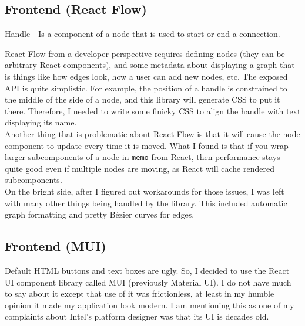\documentclass[12pt]{report}
\begin{document}
\subsection{Frontend (React Flow)}

\begin{tcolorbox}[title=Vocabulary]
Handle - Is a component of a node that is used to start or end a connection.
\end{tcolorbox}
React Flow from a developer perspective requires defining nodes (they can be arbitrary React components), and some metadata about displaying a graph that is things like how edges look, how a user can add new nodes, etc. 
The exposed API is quite simplistic. 
For example, the position of a handle is constrained to the middle of the side of a node, and this library will generate CSS to put it there. 
Therefore, I needed to write some finicky CSS to align the handle with text displaying its name.
\\
Another thing that is problematic about React Flow is that it will cause the node component to update every time it is moved.
What I found is that if you wrap larger subcomponents of a node in \verb!memo! from React, then performance stays quite good even if multiple nodes are moving, as React will cache rendered subcomponents.
\\
On the bright side, after I figured out workarounds for those issues, I was left with many other things being handled by the library. This included automatic graph formatting and pretty Bézier curves for edges. 

\subsection{Frontend (MUI)}

Default HTML buttons and text boxes are ugly. So, I decided to use the React UI component library called MUI (previously Material UI). I do not have much to say about it except that use of it was frictionless, at least in my humble opinion it made my application look modern. I am mentioning this as one of my complaints about Intel's platform designer was that its UI is decades old.
 
\end{document}
